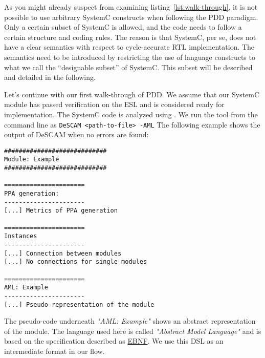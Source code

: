 As you might already suspect from examining
listing~\ref{lst:walk-through}, it is not possible to use arbitrary
SystemC constructs when following the PDD paradigm. %
Only a certain subset of SystemC is allowed, and the code needs to
follow a certain structure and coding rules. %
The reason is that SystemC, per se, does not have a clear semantics
with respect to cycle-accurate RTL implementation. %
The semantics need to be introduced by restricting the use of language
constructs to what we call the ``designable subset'' of SystemC. %
This subset will be described and detailed in the following. %

Let's continue with our first walk-through of PDD. %
We assume that our SystemC module has passed verification on the ESL
and is considered ready for implementation. %
The SystemC code is analyzed using \DeSCAM{}. %
We run the tool from the command line as \texttt{DeSCAM <path-to-file> -AML}
The following example shows the output of DeSCAM %
when no errors are found:
\begin{small}
\begin{verbatim}
############################
Module: Example
############################

======================
PPA generation:
----------------------
[...] Metrics of PPA generation

======================
Instances
----------------------
[...] Connection between modules
[...] No connections for single modules

======================
AML: Example
----------------------
[...] Pseudo-representation of the module
\end{verbatim}
\end{small}

The pseudo-code underneath \textit{"AML: Example"} shows an abstract
representation of the module. %
The language used here is called \textit{"Abstract Model Language"}
and is based on the specification described as \href{https://www.eit.uni-kl.de/fileadmin/eis/PPA/designflow/AML-syntax.txt}{EBNF}.
We use this DSL as an intermediate format in our flow.

